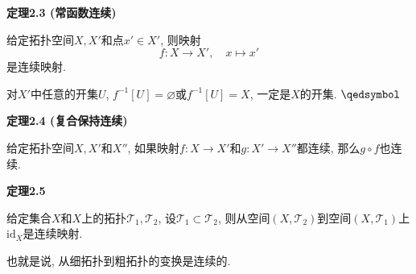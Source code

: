 \documentclass[UTF8]{ctexart}
\begin{document}
\hypertarget{sec:定理2.3}{}
\noindent\textbf{定理2.3 (常函数连续)}

给定拓扑空间$X,X'$和点$x'\in X'$, 则映射
\[
    f:X\to X',\quad x\mapsto x'
\]
是连续映射.


对$X'$中任意的开集$U$, $f^{-1}[U]=\varnothing$或$f^{-1}[U]=X$, 一定是$X$的开集.
\hfill $\qedsymbol$

\vspace{10pt}

\hypertarget{sec:定理2.4}{}
\noindent\textbf{定理2.4 (复合保持连续)}

给定拓扑空间$X,X'$和$X''$,
如果映射$f:X\to X'$和$g:X'\to X''$都连续, 那么$g\circ f$也连续.

\vspace{10pt}

\hypertarget{sec:定理2.5}{}
\noindent\textbf{定理2.5}

给定集合$X$和$X$上的拓扑$\mathcal{T}_1,\mathcal{T}_2$,
设$\mathcal{T}_1\subset\mathcal{T}_2$,
则从空间$(X,\mathcal{T}_2)$到空间$(X,\mathcal{T}_1)$上$\mathrm{id}_X$是连续映射.

也就是说, 从细拓扑到粗拓扑的变换是连续的.

\end{document}
